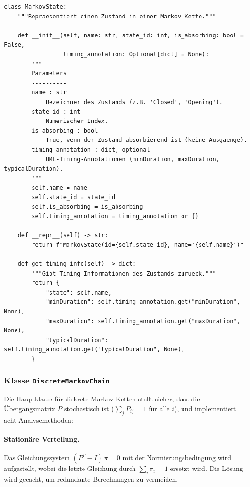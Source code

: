 ﻿\documentclass[a4paper,12pt]{scrreprt}
\theoremstyle{definition}
\begin{document}
\begin{lstlisting}[style=python, caption={MarkovState: Zustand mit MARTE-konformen Timing-Annotationen}, label=lst:markovstate]
class MarkovState:
    """Repraesentiert einen Zustand in einer Markov-Kette."""

    def __init__(self, name: str, state_id: int, is_absorbing: bool = False,
                 timing_annotation: Optional[dict] = None):
        """
        Parameters
        ----------
        name : str
            Bezeichner des Zustands (z.B. 'Closed', 'Opening').
        state_id : int
            Numerischer Index.
        is_absorbing : bool
            True, wenn der Zustand absorbierend ist (keine Ausgaenge).
        timing_annotation : dict, optional
            UML-Timing-Annotationen (minDuration, maxDuration, typicalDuration).
        """
        self.name = name
        self.state_id = state_id
        self.is_absorbing = is_absorbing
        self.timing_annotation = timing_annotation or {}

    def __repr__(self) -> str:
        return f"MarkovState(id={self.state_id}, name='{self.name}')"

    def get_timing_info(self) -> dict:
        """Gibt Timing-Informationen des Zustands zurueck."""
        return {
            "state": self.name,
            "minDuration": self.timing_annotation.get("minDuration", None),
            "maxDuration": self.timing_annotation.get("maxDuration", None),
            "typicalDuration": self.timing_annotation.get("typicalDuration", None),
        }
\end{lstlisting}

\subsubsection{Klasse \texttt{DiscreteMarkovChain}}

Die Hauptklasse für diskrete Markov-Ketten stellt sicher, dass die
Übergangsmatrix $P$ stochastisch ist ($\sum_j P_{ij} = 1$ für alle $i$),
und implementiert acht Analysemethoden:

\paragraph{Stationäre Verteilung.}
Das Gleichungssystem $(P^T - I)\,\pi = 0$ mit der Normierungsbedingung
wird aufgestellt, wobei die letzte Gleichung durch $\sum_i \pi_i = 1$
ersetzt wird. Die Lösung wird gecacht, um redundante Berechnungen zu vermeiden.
\end{document}
